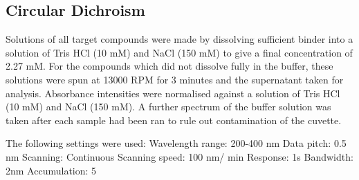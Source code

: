 \subsection*{Circular Dichroism}
Solutions of all target compounds were made by dissolving sufficient binder into a solution of Tris HCl (10 mM) and NaCl (150 mM) to give a final concentration of 2.27 mM. 
\newline
For the compounds which did not dissolve fully in the buffer, these solutions were spun at 13000 RPM for 3 minutes and the supernatant taken for analysis. 
\newline
Absorbance intensities were normalised against a solution of Tris HCl (10 mM) and NaCl (150 mM). A further spectrum of the buffer solution was taken after each sample had been ran to rule out contamination of the cuvette. 

The following settings were used:
\newline
Wavelength range: 200-400 nm
\newline
Data pitch: 0.5 nm
\newline
Scanning: Continuous
\newline
Scanning speed: 100 nm/ min
\newline
Response: 1s
\newline
Bandwidth: 2nm
\newline
Accumulation: 5
